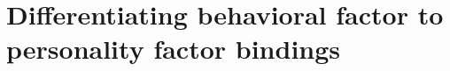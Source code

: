 \documentclass{article}
\begin{document}
   \newpage
   \section{Differentiating behavioral factor to personality factor bindings}

\end{document}
